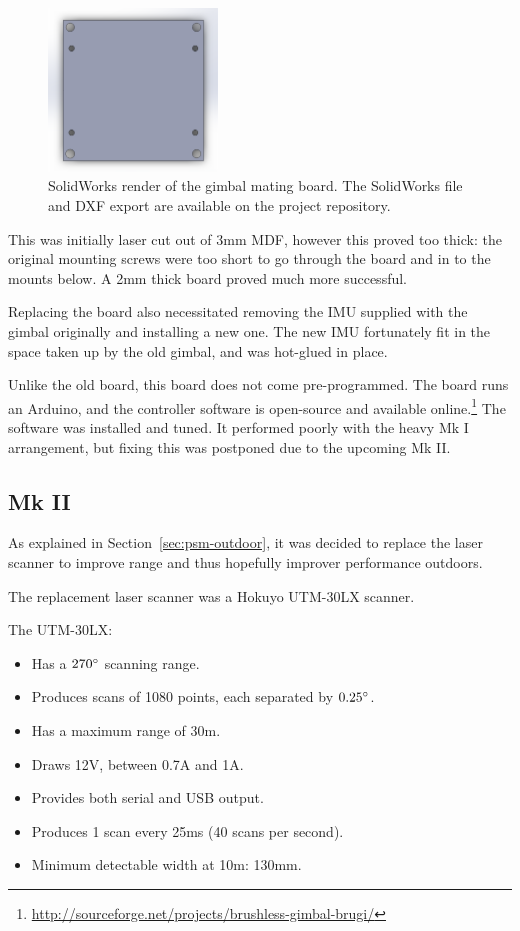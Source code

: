 \documentclass[12pt,oneside,a4paper]{book}
\begin{document}
\begin{figure}[h]
  \centering
  \includegraphics[width=0.4\textwidth]{figs/gmb}
  \caption{SolidWorks render of the gimbal mating board. The
    SolidWorks file and DXF export are available on the project repository.}
  \label{fig:gmb}
\end{figure}

This was initially laser cut out of 3mm MDF,
however this proved too thick: the original mounting screws were too
short to go through the board and in to the mounts below. A 2mm thick board
proved much more successful.
 
Replacing the board also necessitated removing the IMU supplied with
the gimbal originally and installing a new one. The new IMU
fortunately fit in the space taken up by the old gimbal, and was
hot-glued in place.

Unlike the old board, this board does not come pre-programmed. The
board runs an Arduino, and the controller software is open-source and
available online.\footnote{\url{http://sourceforge.net/projects/brushless-gimbal-brugi/}} The software was installed and
tuned. It performed poorly with the heavy Mk I arrangement, but fixing
this was postponed due to the upcoming Mk II.

\subsection{Mk II}
\label{sec:mk-ii}

As explained in Section~\ref{sec:psm-outdoor}, it was decided to
replace the laser scanner to improve range and thus hopefully improver
performance outdoors.

The replacement laser scanner was a Hokuyo UTM-30LX scanner. 

The UTM-30LX:
\begin{itemize}
\item Has a $270\degree$ scanning range.
\item Produces scans of 1080 points, each separated by $0.25\degree$.
\item Has a maximum range of 30m.
\item Draws 12V, between 0.7A and 1A.
\item Provides both serial and USB output.
\item Produces 1 scan every 25ms (40 scans per second).
\item Minimum detectable width at 10m: 130mm.
\end{itemize}
\end{document}
